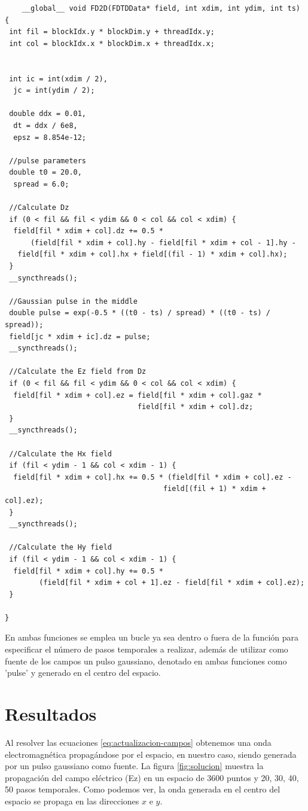 \documentclass[11pt,a4paper,twoside,pdf]{article}
\numberwithin{equation}{section}
\begin{document}
\begin{verbatim}
    __global__ void FD2D(FDTDData* field, int xdim, int ydim, int ts)
{
 int fil = blockIdx.y * blockDim.y + threadIdx.y;
 int col = blockIdx.x * blockDim.x + threadIdx.x;


 int ic = int(xdim / 2),
  jc = int(ydim / 2);

 double ddx = 0.01,
  dt = ddx / 6e8,
  epsz = 8.854e-12;

 //pulse parameters
 double t0 = 20.0,
  spread = 6.0;

 //Calculate Dz
 if (0 < fil && fil < ydim && 0 < col && col < xdim) {
  field[fil * xdim + col].dz += 0.5 * 
      (field[fil * xdim + col].hy - field[fil * xdim + col - 1].hy -
   field[fil * xdim + col].hx + field[(fil - 1) * xdim + col].hx);
 }
 __syncthreads();

 //Gaussian pulse in the middle
 double pulse = exp(-0.5 * ((t0 - ts) / spread) * ((t0 - ts) / spread));
 field[jc * xdim + ic].dz = pulse;
 __syncthreads();

 //Calculate the Ez field from Dz
 if (0 < fil && fil < ydim && 0 < col && col < xdim) {
  field[fil * xdim + col].ez = field[fil * xdim + col].gaz * 
                               field[fil * xdim + col].dz;
 }
 __syncthreads();

 //Calculate the Hx field
 if (fil < ydim - 1 && col < xdim - 1) {
  field[fil * xdim + col].hx += 0.5 * (field[fil * xdim + col].ez - 
                                     field[(fil + 1) * xdim + col].ez);
 }
 __syncthreads();

 //Calculate the Hy field
 if (fil < ydim - 1 && col < xdim - 1) {
  field[fil * xdim + col].hy += 0.5 * 
        (field[fil * xdim + col + 1].ez - field[fil * xdim + col].ez);
 }

}
\end{verbatim}

En ambas funciones se emplea un bucle ya sea dentro o fuera de la función para especificar el número de pasos temporales a realizar, además de utilizar como fuente de los campos un pulso gaussiano, denotado en ambas funciones como 'pulse' y generado en el centro del espacio.





\section{Resultados}

Al resolver las ecuaciones \ref{eq:actualizacion-campos} obtenemos una onda electromagnética propagándose por el espacio, en nuestro caso, siendo generada por un pulso gaussiano como fuente. La figura \ref{fig:solucion} muestra la propagación del campo eléctrico (Ez) en un espacio de 3600 puntos y 20, 30, 40, 50 pasos temporales. Como podemos ver, la onda generada en el centro del espacio se propaga en las direcciones $x$ e $y$.  
\end{document}
